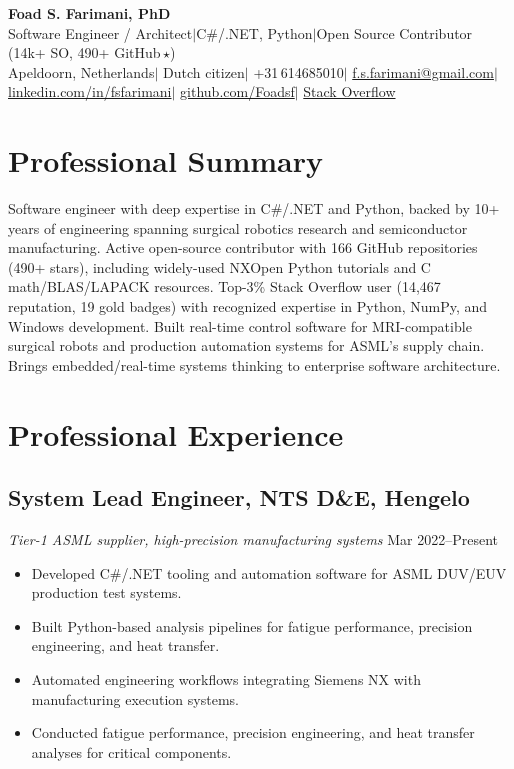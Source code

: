 \documentclass[11pt,a4paper]{article}
\begin{document}
\begin{center}
 {\LARGE\bfseries Foad S. Farimani, PhD} \\[4pt]
 {\small Software Engineer / Architect\enspace$\mid$\enspace C\#/.NET, Python\enspace$\mid$\enspace Open Source Contributor (14k+ SO, 490+ GitHub\,$\star$)}
 \\[6pt]
 {\small
  Apeldoorn, Netherlands\enspace$\mid$\enspace
  Dutch citizen\enspace$\mid$\enspace
  +31\,614685010\enspace$\mid$\enspace
  \href{mailto:f.s.farimani@gmail.com}{f.s.farimani@gmail.com}\enspace$\mid$\enspace
  \href{https://linkedin.com/in/fsfarimani}{linkedin.com/in/fsfarimani}\enspace$\mid$\enspace
  \href{https://github.com/Foadsf}{github.com/Foadsf}\enspace$\mid$\enspace
  \href{https://stackoverflow.com/users/4999991}{Stack Overflow}
 }
\end{center}

\section{Professional Summary}
Software engineer with deep expertise in C\#/.NET and Python, backed by 10+ years of engineering spanning surgical robotics research and semiconductor manufacturing. Active open-source contributor with 166 GitHub repositories (490+ stars), including widely-used NXOpen Python tutorials and C math/BLAS/LAPACK resources. Top-3\% Stack Overflow user (14,467 reputation, 19 gold badges) with recognized expertise in Python, NumPy, and Windows development. Built real-time control software for MRI-compatible surgical robots and production automation systems for ASML's supply chain. Brings embedded/real-time systems thinking to enterprise software architecture.

\section{Professional Experience}

\subsection{System Lead Engineer, NTS D\&E, Hengelo}
{\small\textit{Tier-1 ASML supplier, high-precision manufacturing systems}} \hfill {\small Mar 2022--Present}
\begin{itemize}
 \item Developed C\#/.NET tooling and automation software for ASML DUV/EUV production test systems.
 \item Built Python-based analysis pipelines for fatigue performance, precision engineering, and heat transfer.
 \item Automated engineering workflows integrating Siemens NX with manufacturing execution systems.
 \item Conducted fatigue performance, precision engineering, and heat transfer analyses for critical components.
\end{itemize}
\end{document}
